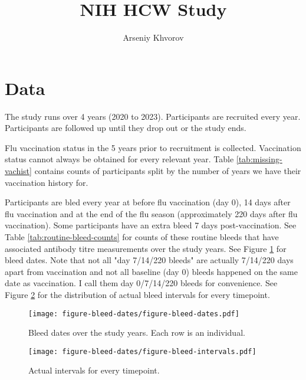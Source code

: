\documentclass[12pt]{article}
\title{NIH HCW Study}
\author{Arseniy Khvorov}
\begin{document}
\maketitle

\section{Data}

The study runs over 4 years (2020 to 2023). 
Participants are recruited every year.
Participants are followed up until they drop out or the study ends.

Flu vaccination status in the 5 years prior to recruitment is collected. Vaccination status cannot always be obtained for every relevant year. Table \ref{tab:missing-vachist} contains counts of participants split by the number of years we have their vaccination history for.



Participants are bled every year at before flu vaccination (day 0), 14 days after flu vaccination and at the end of the flu season (approximately 220 days after flu vaccination). 
Some participants have an extra bleed 7 days post-vaccination.
See Table \ref{tab:routine-bleed-counts} for counts of these routine bleeds that have associated antibody titre measurements over the study years. 
See Figure \ref{fig:bleed-dates} for bleed dates.
Note that not all "day 7/14/220 bleeds" are actually 7/14/220 days apart from vaccination and not all baseline (day 0) bleeds happened on the same date as vaccination.
I call them day 0/7/14/220 bleeds for convenience.
See Figure \ref{fig:bleed-intervals} for the distribution of actual bleed intervals for every timepoint.



\begin{figure}
	\texttt{[image: figure-bleed-dates/figure-bleed-dates.pdf]}
	\caption{Bleed dates over the study years. Each row is an individual.}
	\label{fig:bleed-dates}
\end{figure}

\begin{figure}
	\texttt{[image: figure-bleed-dates/figure-bleed-intervals.pdf]}
	\caption{Actual intervals for every timepoint.}
	\label{fig:bleed-intervals}
\end{figure}
\end{document}
